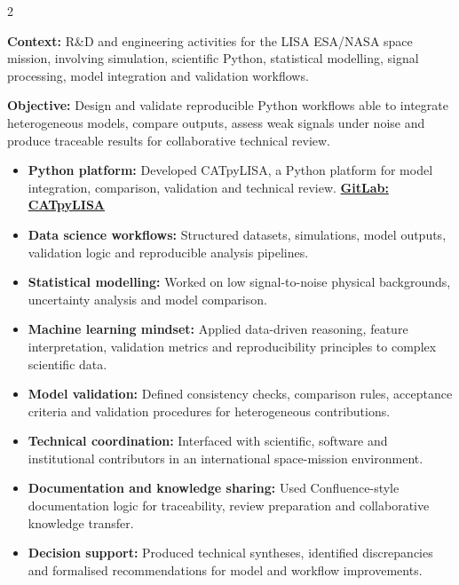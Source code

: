 \documentclass[8pt,a4paper,ragged2e,withhyper]{../_shared/altacv}
\begin{document}
\begin{paracol}{2}
\divider


\textbf{Context:} R\&D and engineering activities for the LISA ESA/NASA space mission, involving simulation, scientific Python, statistical modelling, signal processing, model integration and validation workflows.

\textbf{Objective:} Design and validate reproducible Python workflows able to integrate heterogeneous models, compare outputs, assess weak signals under noise and produce traceable results for collaborative technical review.

\begin{itemize}
  \item \textbf{Python platform:} Developed CATpyLISA, a Python platform for model integration, comparison, validation and technical review.
  \textcolor{DarkPastelRed}{\href{https://gitlab.oca.eu/gboileau/lisa_l3_tools}{\bf GitLab: CATpyLISA}}
  \item \textbf{Data science workflows:} Structured datasets, simulations, model outputs, validation logic and reproducible analysis pipelines.
  \item \textbf{Statistical modelling:} Worked on low signal-to-noise physical backgrounds, uncertainty analysis and model comparison.
  \item \textbf{Machine learning mindset:} Applied data-driven reasoning, feature interpretation, validation metrics and reproducibility principles to complex scientific data.
  \item \textbf{Model validation:} Defined consistency checks, comparison rules, acceptance criteria and validation procedures for heterogeneous contributions.
  \item \textbf{Technical coordination:} Interfaced with scientific, software and institutional contributors in an international space-mission environment.
  \item \textbf{Documentation and knowledge sharing:} Used Confluence-style documentation logic for traceability, review preparation and collaborative knowledge transfer.
  \item \textbf{Decision support:} Produced technical syntheses, identified discrepancies and formalised recommendations for model and workflow improvements.
\end{itemize}

\divider


\end{paracol}
\end{document}
